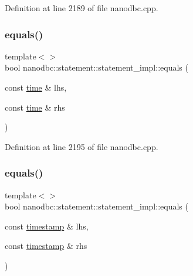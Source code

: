 Definition at line 2189 of file nanodbc.\+cpp.

\mbox{\label{classnanodbc_1_1statement_1_1statement__impl_a4beb04fdfbb8cf3e93ea94f29fe0a90f}} 
\subsubsection{\texorpdfstring{equals()}{equals()}\hspace{0.1cm}{\footnotesize\ttfamily [5/6]}}
{\footnotesize\ttfamily template$<$$>$ \\
bool nanodbc\+::statement\+::statement\+\_\+impl\+::equals (\begin{DoxyParamCaption}\item[{const \mbox{\hyperlink{structnanodbc_1_1time}{time}} \&}]{lhs,  }\item[{const \mbox{\hyperlink{structnanodbc_1_1time}{time}} \&}]{rhs }\end{DoxyParamCaption})}



Definition at line 2195 of file nanodbc.\+cpp.

\mbox{\label{classnanodbc_1_1statement_1_1statement__impl_ad8a9101dce32edc83bab597c44211bff}} 
\subsubsection{\texorpdfstring{equals()}{equals()}\hspace{0.1cm}{\footnotesize\ttfamily [6/6]}}
{\footnotesize\ttfamily template$<$$>$ \\
bool nanodbc\+::statement\+::statement\+\_\+impl\+::equals (\begin{DoxyParamCaption}\item[{const \mbox{\hyperlink{structnanodbc_1_1timestamp}{timestamp}} \&}]{lhs,  }\item[{const \mbox{\hyperlink{structnanodbc_1_1timestamp}{timestamp}} \&}]{rhs }\end{DoxyParamCaption})}



